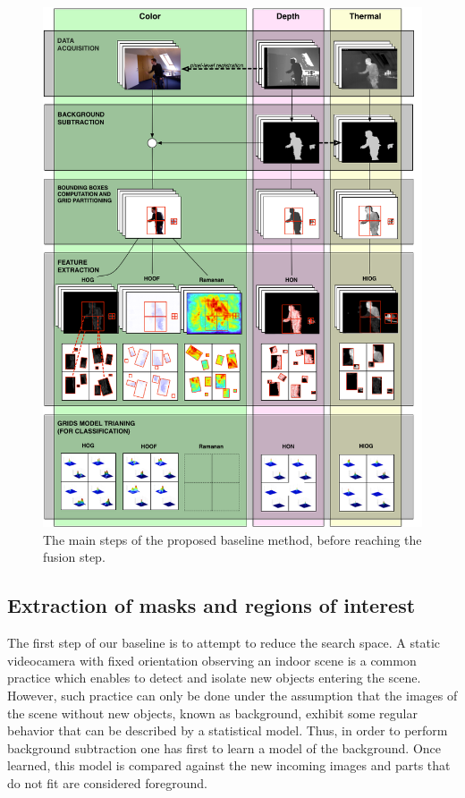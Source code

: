 \documentclass[10pt,twocolumn,letterpaper]{article}
\begin{document}
\begin{figure}[ht!]
	\centering
	\includegraphics[width=\linewidth]{pictures/diagram.png}
	\caption{The main steps of the proposed baseline method, before reaching the fusion step.}
	\label{fig:baseline}
\end{figure}


\subsection{Extraction of masks and regions of interest} 
\label{ssec:bsbb}

The first step of our baseline is to attempt to reduce the search space. A static videocamera with fixed orientation observing an indoor scene is a common practice which enables to detect and isolate new objects entering the scene. However, such practice can only be done under the assumption that the images of the scene without new objects, known as background, exhibit some regular behavior that can be described by a statistical model. Thus, in order to perform background subtraction one has first to learn a model of the background. Once learned, this model is compared against the new incoming images and parts that do not fit are considered foreground.
\end{document}
